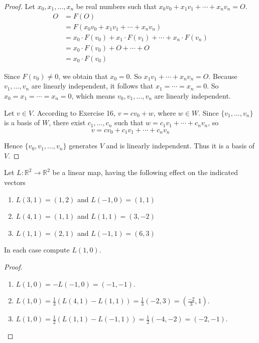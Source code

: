 \begin{proof}
    Let $x_{0}, x_{1}, \ldots, x_{n}$ be real numbers such that $x_{0}v_{0} + x_{1}v_{1} + \cdots + x_{n}v_{n} = O$.
    \begin{align*}
        O & = F(O)                                                                     \\
          & = F(x_{0}v_{0} + x_{1}v_{1} + \cdots + x_{n}v_{n})                         \\
          & = x_{0}\cdot F(v_{0}) + x_{1}\cdot F(v_{1}) + \cdots + x_{n}\cdot F(v_{n}) \\
          & = x_{0}\cdot F(v_{0}) + O + \cdots + O                                     \\
          & = x_{0}\cdot F(v_{0})
    \end{align*}

    Since $F(v_{0}) \ne 0$, we obtain that $x_{0} = 0$. So $x_{1}v_{1} + \cdots + x_{n}v_{n} = O$. Because $v_{1}, \ldots, v_{n}$ are linearly independent, it follows that $x_{1} = \cdots = x_{n} = 0$. So $x_{0} = x_{1} = \cdots = x_{n} = 0$, which means $v_{0}, v_{1}, \ldots, v_{n}$ are linearly independent.

    Let $v\in V$. According to Exercise 16, $v = cv_{0} + w$, where $w\in W$. Since $\{ v_{1}, \ldots, v_{n} \}$ is a basis of $W$, there exist $c_{1}, \ldots, c_{n}$ such that $w = c_{1}v_{1} + \cdots + c_{n}v_{n}$, so
    \[
        v = cv_{0} + c_{1}v_{1} + \cdots + c_{n}v_{n}
    \]

    Hence $\{ v_{0}, v_{1}, \ldots, v_{n} \}$ generates $V$ and is linearly independent. Thus it is a basis of $V$.
\end{proof}

\begin{exercise}
    Let $L: \mathbb{R}^{2} \to \mathbb{R}^{2}$ be a linear map, having the following effect on the indicated vectors
    \begin{enumerate}[label={(\alph*)}]
        \item $L(3, 1) = (1, 2)$ and $L(-1, 0) = (1, 1)$
        \item $L(4, 1) = (1, 1)$ and $L(1, 1) = (3, -2)$
        \item $L(1, 1) = (2, 1)$ and $L(-1, 1) = (6, 3)$
    \end{enumerate}

    In each case compute $L(1, 0)$.
\end{exercise}

\begin{proof}
    \begin{enumerate}[label={(\alph*)}]
        \item $L(1, 0) = -L(-1, 0) = (-1, -1)$.
        \item $L(1, 0) = \frac{1}{3}(L(4, 1) - L(1, 1)) = \frac{1}{3}(-2, 3) = (\frac{-2}{3}, 1)$.
        \item $L(1, 0) = \frac{1}{2}(L(1, 1) - L(-1, 1)) = \frac{1}{2}(-4, -2) = (-2, -1)$.
    \end{enumerate}
\end{proof}


